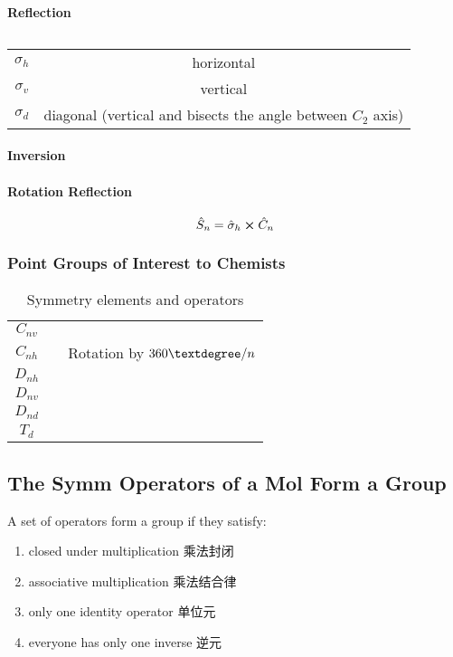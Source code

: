 \documentclass[a4paper]{article}
\numberwithin{equation}{section}
\begin{document}
\paragraph{Reflection}
\begin{table}[H]
	\centering
	\begin{tabular}{cc}
		\hline
		$ \sigma_h $ & horizontal\\
		$ \sigma_v $ & vertical\\
		$ \sigma_d $ & diagonal (vertical and bisects the angle between $ C_2 $ axis)\\
		\hline
	\end{tabular}
	\caption{}
\end{table}
\paragraph{Inversion}
\paragraph{Rotation Reflection}
\begin{equation}\label{key}
\hat{S}_n = \hat\sigma_h \cross \hat{C}_n
\end{equation}

\subsubsection{Point Groups of Interest to Chemists}
\begin{table}[H]
	\centering
	\begin{tabular}{ccc}
		\hline
		$ C_{nv} $ & &  \\
		$ C_{nh} $ &  & Rotation by $ 360\textdegree/n $\\
		$ D_{nh} $ & &\\
		$ D_{nv} $ &&\\
		$ D_{nd} $ &&\\
		$ T_d $ &&\\
		\hline
	\end{tabular}
	\caption{Symmetry elements and operators}
\end{table}

\subsection{The Symm Operators of a Mol Form a Group}
A set of operators form a group if they satisfy:
\begin{enumerate}
	\item closed under multiplication 乘法封闭
	\item associative multiplication 乘法结合律
	\item only one identity operator 单位元
	\item everyone has only one inverse 逆元
\end{enumerate}
\end{document}
